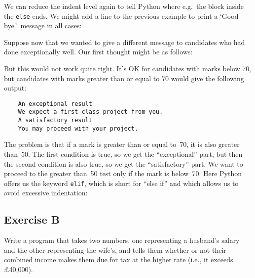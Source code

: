 We can reduce the indent level again to tell Python where e.g.\
the block inside the \verb!else! ends. We might add
a line to the previous example to print a `Good bye.'\ message
in all cases:






Suppose now that we wanted to give a different message to candidates who
had done exceptionally well. Our first thought might be as follows:


But this would not work quite right.  It's OK for candidates with
marks below 70,
but candidates with marks greater than or equal to 70 
would give the following output:

\begin{Verbatim}
    An exceptional result
    We expect a first-class project from you.
    A satisfactory result
    You may proceed with your project.
\end{Verbatim}

The problem is that if a mark is greater than or equal to~70, it is
also greater than~50.  The first
condition is true, so we get the ``exceptional'' part, but then the second
condition is also true, so we get the ``satisfactory'' part.  We want to
proceed to the greater than~50 test only if the mark is below~70.
Here Python offers us the keyword \verb!elif!, which is short for
``else if'' and which allows us to avoid excessive indentation:


\subsection*{Exercise B}

Write a program that takes two numbers, one representing a
husband's salary and the other representing the wife's, and tells them
whether or not their combined income makes them due for tax at the higher rate
(i.e., it exceeds \pounds 40,000).

